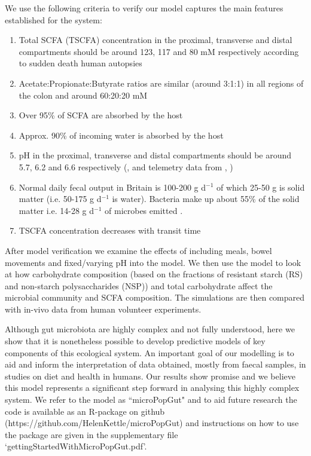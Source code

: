 \documentclass[a4paper]{article}
\begin{document}
We use the following criteria to verify our model captures the main features established for the system:
\begin{enumerate}
\item Total SCFA (TSCFA) concentration in the proximal, transverse and distal compartments should be around 123, 117 and 80 mM respectively according to sudden death human autopsies \citep{cummings} 
\item Acetate:Propionate:Butyrate ratios are similar (around 3:1:1) in all regions of the colon and around 60:20:20 mM \citep{cummings}
\item Over 95\% of SCFA are absorbed by the host \citep{Topping}
\item Approx. 90\% of incoming water is absorbed by the host \citep{Phillips} 
\item pH in the proximal, transverse and distal compartments should be around 5.7, 6.2 and 6.6 respectively (\cite{cummings}, and telemetry data from \cite{miko}, \cite{bown1974})
\item Normal daily fecal output in Britain is 100-200 g d$^{-1}$ of which 25-50 g is solid matter (i.e. 50-175 g d$^{-1}$ is water). Bacteria make up about 55\% of the solid matter i.e. 14-28 g d$^{-1}$ of microbes emitted \citep{StephenCummings}.
\item TSCFA concentration decreases with transit time \citep{Lewis}
\end{enumerate}
After model verification we examine the effects of including meals, bowel movements and fixed/varying pH into the model. We then use the model to look at how carbohydrate composition (based on the fractions of resistant starch (RS) and non-starch polysaccharides (NSP)) and total carbohydrate affect the microbial community and SCFA composition. The simulations are then compared with in-vivo data from human volunteer experiments. 

Although gut microbiota are highly complex and not fully understood, here we show that it is nonetheless possible to develop predictive models of key components of this ecological system. 
An important goal of our modelling is to aid and inform the interpretation of data obtained, mostly from faecal samples, in studies on diet and health in humans.
Our results show promise and we believe this model represents a significant step forward in analysing this highly complex system. 
We refer to the model as ``microPopGut" and to aid future research the code is available as an R-package on github (https://github.com/HelenKettle/microPopGut) and instructions on how to use the package are given in the supplementary file `gettingStartedWithMicroPopGut.pdf'.
\end{document}
